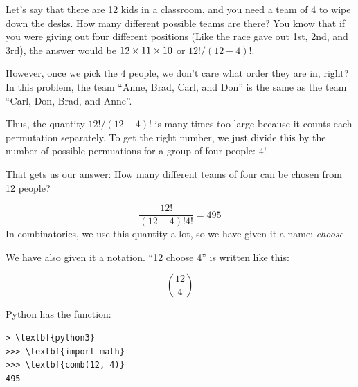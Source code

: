 Let's say that there are 12 kids in a classroom, and you need a team
of 4 to wipe down the desks. How many different possible teams are
there? You know that if you were giving out four different positions
(Like the race gave out 1st, 2nd, and 3rd), the answer would be $12
\times 11 \times 10 \time 9$ or $12! / (12 - 4)!$.

However, once we pick the 4 people, we don't care what order they are
in, right?  In this problem, the team ``Anne, Brad, Carl, and Don'' is
the same as the team ``Carl, Don, Brad, and Anne''.

Thus, the quantity $12! / (12 - 4)!$ is many times too large because
it counts each permutation separately. To get the right number, we
just divide this by the number of possible permuations for a group of
four people: $4!$

That gets us our answer: How many different teams of four can be chosen from 12 people?

$$\frac{12!}{(12-4)! 4!}= 495$$
In combinatorics, we use this quantity a lot, so we have given it a name: \textit{choose}

We have also given it a notation. ``12 choose 4'' is written like this:

$${12 \choose 4}$$

Python has the  function:

\begin{Verbatim}[commandchars=\\\{\}]
> \textbf{python3}
>>> \textbf{import math}
>>> \textbf{comb(12, 4)}
495  
\end{Verbatim}


